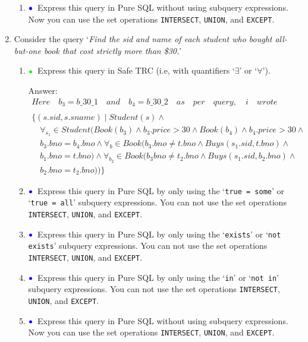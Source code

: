 \documentclass[11pt]{article}
\newcommand{\green}[1]{{\color{green}#1}}
\newcommand{\blue}[1]{{\color{blue}#1}}
\newcommand{\greenbullet}{$\green{\bullet}$}
\newcommand{\bluebullet}{$\blue{\bullet}$}
\begin{document}
\begin{enumerate}[resume]
\begin{enumerate}
     
    \item    \bluebullet\  Express this query in Pure SQL without using subquery expressions.
    Now you can use the set operations {\tt INTERSECT}, {\tt UNION}, and {\tt EXCEPT}.
    \end{enumerate}


\item \label{queryFive} Consider the query `\emph{Find the sid and name of each student who bought all-but-one book that cost strictly more than \$30.}'

    \begin{enumerate}
    \item \greenbullet\  Express this query in Safe TRC (i.e, with quantifiers `$\exists$' or `$\forall$').
    
    Answer:{\large
\[
\begin{array}{l}
 Here \quad b_{3} =b\_30\_1 \quad  and \quad b_{4} =b\_30\_2 \quad as  \quad per  \quad query, \quad i \quad wrote\\ 
 \\
\{(s.sid,s.sname) \mid Student(s) \land \\ \quad
\forall_{s_{1}} \in Student( Book(b_{3}) \land b_{3}.price > 30 \land Book(b_{4} )\land b_{4}.price >30 \land \\ \quad b_{3}.bno =b_{4}.bno \land \forall_{b} \in Book(b_{3}.bno \neq t.bno \land Buys(s_{1}.sid,t.bno)\land \\ \quad b_{1}.bno=t.bno)\land \forall_{b_{2}}\in Book (b_{3}bno \neq t_{2}.bno \land Buys(s_{1}.sid,b_{2}.bno)\land\\ \quad b_{2}.bno = t_{2}.bno))
\}
\end{array}
\]
}
   
    
    \item \bluebullet\ Express this query in Pure SQL by only using the `{\tt true = some}' or `{\tt true = all}' subquery expressions.
    You can not use the set operations {\tt INTERSECT}, {\tt UNION}, and {\tt EXCEPT}.
    
    \item  \bluebullet\  Express this query in Pure SQL by only using the `{\tt exists}'  or `{\tt not exists}' subquery expressions.
    You can not use the set operations {\tt INTERSECT}, {\tt UNION}, and {\tt EXCEPT}.

    
    \item  \bluebullet\  Express this query in Pure SQL by only using the `{\tt in}' or `{\tt not in}' subquery expressions.
    You can not use the set operations {\tt INTERSECT}, {\tt UNION}, and {\tt EXCEPT}.
    
    \item    \bluebullet\  Express this query in Pure SQL without using subquery expressions.
    Now you can use the set operations {\tt INTERSECT}, {\tt UNION}, and {\tt EXCEPT}.
    \end{enumerate}


\end{enumerate}
\end{document}
